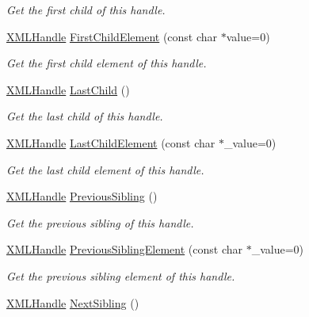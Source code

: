 \begin{DoxyCompactItemize}
\begin{DoxyCompactList}\small\item\em Get the first child of this handle. \end{DoxyCompactList}\item 
\hyperlink{classtinyxml2_1_1_x_m_l_handle}{X\-M\-L\-Handle} \hyperlink{classtinyxml2_1_1_x_m_l_handle_a99edff695a3cd3feff8a329189140a33}{First\-Child\-Element} (const char $\ast$value=0)
\begin{DoxyCompactList}\small\item\em Get the first child element of this handle. \end{DoxyCompactList}\item 
\hyperlink{classtinyxml2_1_1_x_m_l_handle}{X\-M\-L\-Handle} \hyperlink{classtinyxml2_1_1_x_m_l_handle_a9d09f04435f0f2f7d0816b0198d0517b}{Last\-Child} ()
\begin{DoxyCompactList}\small\item\em Get the last child of this handle. \end{DoxyCompactList}\item 
\hyperlink{classtinyxml2_1_1_x_m_l_handle}{X\-M\-L\-Handle} \hyperlink{classtinyxml2_1_1_x_m_l_handle_a4073e768ebc434b2605343b709a9a554}{Last\-Child\-Element} (const char $\ast$\-\_\-value=0)
\begin{DoxyCompactList}\small\item\em Get the last child element of this handle. \end{DoxyCompactList}\item 
\hyperlink{classtinyxml2_1_1_x_m_l_handle}{X\-M\-L\-Handle} \hyperlink{classtinyxml2_1_1_x_m_l_handle_a428374e756f4db4cbc287fec64eae02c}{Previous\-Sibling} ()
\begin{DoxyCompactList}\small\item\em Get the previous sibling of this handle. \end{DoxyCompactList}\item 
\hyperlink{classtinyxml2_1_1_x_m_l_handle}{X\-M\-L\-Handle} \hyperlink{classtinyxml2_1_1_x_m_l_handle_a31a0d5d060292bec5df2b2efe2eca228}{Previous\-Sibling\-Element} (const char $\ast$\-\_\-value=0)
\begin{DoxyCompactList}\small\item\em Get the previous sibling element of this handle. \end{DoxyCompactList}\item 
\hyperlink{classtinyxml2_1_1_x_m_l_handle}{X\-M\-L\-Handle} \hyperlink{classtinyxml2_1_1_x_m_l_handle_aad2eccc7c7c7b18145877c978c3850b5}{Next\-Sibling} ()

\end{DoxyCompactItemize}
